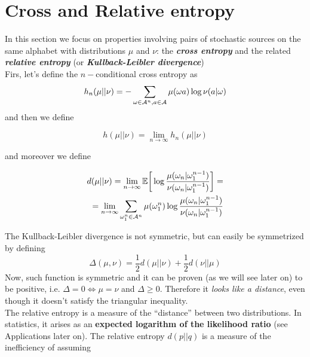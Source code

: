 \section{Cross and Relative entropy}
In this section we focus on properties involving pairs of stochastic sources
on the same alphabet with distributions  $\mu$ and $\nu$: the \textbf{\textit{cross entropy}} and the related \textbf{\textit{relative entropy}} (or \textbf{\textit{Kullback-Leibler divergence}})
\\Firs, let's define the $n-$conditional cross entropy as
\begin{equation}
    h_n(\mu || \nu) = - \sum_{\omega \in \mathcal{A}^n, a \in \mathcal{A}} \mu(\omega a) \log \nu(a| \omega)
\end{equation}
and then we define
\begin{definition}
    \begin{equation}
        h(\mu || \nu) = \lim_{n \rightarrow \infty} h_n(\mu || \nu)
    \end{equation}
\end{definition}
and moreover we define 
\begin{definition}
    \begin{align}
        d(\mu || \nu) = \lim_{n \rightarrow \infty} \mathbb{E} \bigg[ \log \frac{\mu(\omega_n|\omega_1^{n-1})}{\nu(\omega_n|\omega_1^{n-1})} \bigg] = \\ = \lim_{n \rightarrow \infty} \sum_{\omega_1^n \in \mathcal{A}^n} \mu(\omega_1^n) \log \frac{\mu(\omega_n|\omega_1^{n-1})}{\nu(\omega_n|\omega_1^{n-1})}
    \end{align}
\end{definition}
The Kullback-Leibler divergence is not symmetric, but can easily be symmetrized by defining
\begin{equation}
    \Delta(\mu, \nu) = \frac{1}{2} d(\mu || \nu) +  \frac{1}{2} d(\nu || \mu) 
\end{equation}
Now, such function is symmetric and it can be proven (as we will see later on) to be positive, i.e. $\Delta=0 \Leftrightarrow \mu = \nu$ and $\Delta \geq 0$. Therefore it \textit{looks like a distance}, even though it doesn't satisfy the triangular inequality. 
\\The relative entropy is a measure of the ``distance'' between two distributions. In statistics, it arises as an \textbf{expected logarithm of the likelihood ratio} (see Applications later on).
The relative entropy $d(p||q)$ is a measure of the inefficiency of assuming
